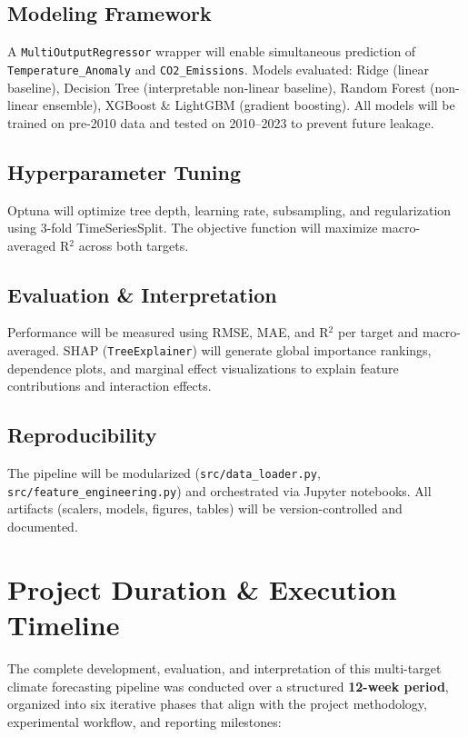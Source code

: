 \documentclass[12pt, a4paper]{article}
\begin{document}
\subsection{Modeling Framework}
A \texttt{MultiOutputRegressor} wrapper will enable simultaneous prediction of \texttt{Temperature\_Anomaly} and \texttt{CO2\_Emissions}. Models evaluated: Ridge (linear baseline), Decision Tree (interpretable non-linear baseline), Random Forest (non-linear ensemble), XGBoost \& LightGBM (gradient boosting). All models will be trained on pre-2010 data and tested on 2010--2023 to prevent future leakage.

\subsection{Hyperparameter Tuning}
Optuna will optimize tree depth, learning rate, subsampling, and regularization using 3-fold TimeSeriesSplit. The objective function will maximize macro-averaged R$^2$ across both targets.

\subsection{Evaluation \& Interpretation}
Performance will be measured using RMSE, MAE, and R$^2$ per target and macro-averaged. SHAP (\texttt{TreeExplainer}) will generate global importance rankings, dependence plots, and marginal effect visualizations to explain feature contributions and interaction effects.

\subsection{Reproducibility}
The pipeline will be modularized (\texttt{src/data\_loader.py}, \texttt{src/feature\_engineering.py}) and orchestrated via Jupyter notebooks. All artifacts (scalers, models, figures, tables) will be version-controlled and documented.
\section{Project Duration \& Execution Timeline}
The complete development, evaluation, and interpretation of this multi-target climate forecasting pipeline was conducted over a structured \textbf{12-week period}, organized into six iterative phases that align with the project methodology, experimental workflow, and reporting milestones:
\end{document}
